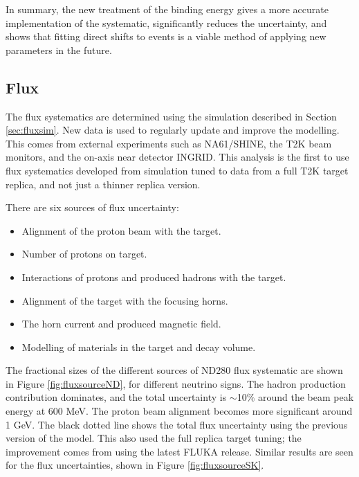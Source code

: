 In summary, the new treatment of the binding energy gives a more accurate implementation of the systematic, significantly reduces the uncertainty, and shows that fitting direct shifts to events is a viable method of applying new parameters in the future.

\subsection{Flux}\label{sec:flux}

The flux systematics are determined using the simulation described in Section \ref{sec:fluxsim}. New data is used to regularly update and improve the modelling. This comes from external experiments such as NA61/SHINE\cite{na61}, the T2K beam monitors, and the on-axis near detector INGRID. This analysis is the first to use flux systematics developed from simulation tuned to data from a full T2K target replica, and not just a thinner replica version.

There are six sources of flux uncertainty:

\begin{itemize}

\item Alignment of the proton beam with the target.

\item Number of protons on target.

\item Interactions of protons and produced hadrons with the target.

\item Alignment of the target with the focusing horns.

\item The horn current and produced magnetic field.

\item Modelling of materials in the target and decay volume.

\end{itemize}

The fractional sizes of the different sources of ND280 flux systematic are shown in Figure \ref{fig:fluxsourceND}, for different neutrino signs. The hadron production contribution dominates, and the total uncertainty is $\sim$10$\%$ around the beam peak energy at 600 MeV. The proton beam alignment becomes more significant around 1 GeV. The black dotted line shows the total flux uncertainty using the previous version of the model. This also used the full replica target tuning; the improvement comes from using the latest \textsc{FLUKA}\cite{fluka} release. Similar results are seen for the \SK flux uncertainties, shown in Figure \ref{fig:fluxsourceSK}.

